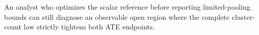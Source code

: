 An analyst who optimizes the scalar reference before reporting limited-pooling bounds can still diagnose an observable open region where the complete cluster-count law strictly tightens both ATE endpoints.